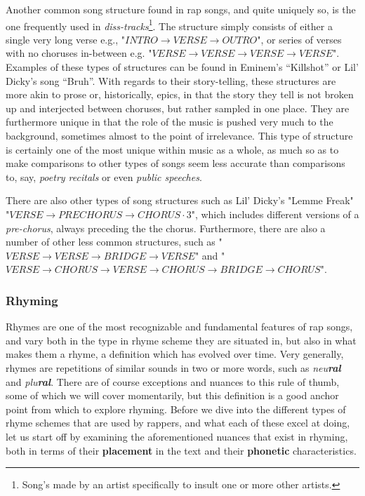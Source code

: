 Another common song structure found in rap songs, and quite uniquely so, is the one frequently used in \textit{diss-tracks}\footnote{Song's made by an artist specifically to insult one or more other artists.}. The structure simply consists of either a single very long verse e.g., "$INTRO \rightarrow VERSE \rightarrow OUTRO$", or series of verses with no choruses in-between e.g. "$VERSE \rightarrow VERSE \rightarrow VERSE \rightarrow VERSE$". Examples of these types of structures can be found in Eminem’s “Killshot” or Lil’ Dicky’s song “Bruh”. With regards to their story-telling, these structures are more akin to prose or, historically, epics, in that the story they tell is not broken up and interjected between choruses, but rather sampled in one place. They are furthermore unique in that the role of the music is pushed very much to the background, sometimes almost to the point of irrelevance. This type of structure is certainly one of the most unique within music as a whole, as much so as to make comparisons to other types of songs seem less accurate than comparisons to, say, \textit{poetry recitals} or even \textit{public speeches}.

There are also other types of song structures such as Lil' Dicky's "Lemme Freak" "$VERSE \rightarrow PRECHORUS \rightarrow CHORUS \cdot 3$", which includes different versions of a \textit{pre-chorus}, always preceding the the chorus. Furthermore, there are also a number of other less common structures, such as "$VERSE \rightarrow VERSE \rightarrow BRIDGE \rightarrow VERSE$" and "$VERSE \rightarrow CHORUS \rightarrow VERSE \rightarrow CHORUS \rightarrow BRIDGE \rightarrow CHORUS$".

\subsubsection{Rhyming}
\label{sec:rhyme+rhyme-schemes}

Rhymes are one of the most recognizable and fundamental features of rap songs, and vary both in the type in rhyme scheme they are situated in, but also in what makes them a rhyme, a definition which has evolved over time. Very generally, rhymes are repetitions of similar sounds in two or more words, such as \textit{neu\textbf{ral}} and \textit{plu\textbf{ral}}. There are of course exceptions and nuances to this rule of thumb, some of which we will cover momentarily, but this definition is a good anchor point from which to explore rhyming. Before we dive into the different types of rhyme schemes that are used by rappers, and what each of these excel at doing, let us start off by examining the aforementioned nuances that exist in rhyming, both in terms of their \textbf{placement} in the text and their \textbf{phonetic} characteristics.

